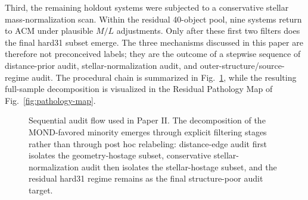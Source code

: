 ﻿\documentclass[aps,prd,twocolumn,superscriptaddress,longbibliography,nofootinbib,floatfix,10pt]{revtex4-2}
\begin{document}
Third, the remaining holdout systems were subjected to a conservative stellar
mass-normalization scan. Within the residual 40-object pool, nine systems
return to ACM under plausible $M/L$ adjustments. Only after these first two
filters does the final hard31 subset emerge. The three mechanisms discussed in
this paper are therefore not preconceived labels; they are the outcome of a
stepwise sequence of distance-prior audit, stellar-normalization audit, and
outer-structure/source-regime audit. The procedural chain is summarized in
Fig.~\ref{fig:audit-flow}, while the resulting full-sample decomposition is
visualized in the Residual Pathology Map of Fig.~\ref{fig:pathology-map}.

\begin{figure}[t]
\centering
{}
\caption{
Sequential audit flow used in Paper II. The decomposition of the MOND-favored
minority emerges through explicit filtering stages rather than through post hoc
relabeling: distance-edge audit first isolates the geometry-hostage subset,
conservative stellar-normalization audit then isolates the stellar-hostage
subset, and the residual hard31 regime remains as the final structure-poor
audit target.
}
\label{fig:audit-flow}
\end{figure}
\end{document}
